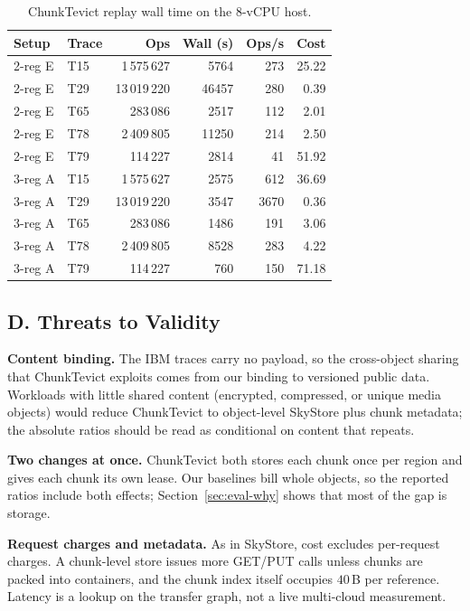 \begin{table}[t]
\centering
\caption{ChunkTevict replay wall time on the 8-v{CPU} host.}
\label{tab:wall}
\setlength{\tabcolsep}{3.2pt}
{\scriptsize
\begin{tabular}{llrrrr}
\toprule
Setup & Trace & Ops & Wall (s) & Ops/s & Cost \\
\midrule
2-reg E & T15 & 1\,575\,627 & 5764 & 273 & 25.22 \\
2-reg E & T29 & 13\,019\,220 & 46457 & 280 & 0.39 \\
2-reg E & T65 & 283\,086 & 2517 & 112 & 2.01 \\
2-reg E & T78 & 2\,409\,805 & 11250 & 214 & 2.50 \\
2-reg E & T79 & 114\,227 & 2814 & 41 & 51.92 \\
3-reg A & T15 & 1\,575\,627 & 2575 & 612 & 36.69 \\
3-reg A & T29 & 13\,019\,220 & 3547 & 3670 & 0.36 \\
3-reg A & T65 & 283\,086 & 1486 & 191 & 3.06 \\
3-reg A & T78 & 2\,409\,805 & 8528 & 283 & 4.22 \\
3-reg A & T79 & 114\,227 & 760 & 150 & 71.18 \\
\bottomrule
\end{tabular}}
\end{table}

\subsection{D. Threats to Validity}
\label{sec:eval-threats}

\textbf{Content binding.}
The {IBM} traces carry no payload, so the cross-object sharing that ChunkTevict exploits comes from our binding to versioned public data.
Workloads with little shared content (encrypted, compressed, or unique media objects) would reduce ChunkTevict to object-level SkyStore plus chunk metadata; the absolute ratios should be read as conditional on content that repeats.

\textbf{Two changes at once.}
ChunkTevict both stores each chunk once per region and gives each chunk its own lease.
Our baselines bill whole objects, so the reported ratios include both effects; Section~\ref{sec:eval-why} shows that most of the gap is storage.

\textbf{Request charges and metadata.}
As in SkyStore, cost excludes per-request charges.
A chunk-level store issues more {GET}/{PUT} calls unless chunks are packed into containers, and the chunk index itself occupies $40$\,B per reference.
Latency is a lookup on the transfer graph, not a live multi-cloud measurement.
